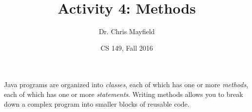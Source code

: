 \documentclass[12pt]{article}
\title{Activity 4: Methods}
\author{Dr. Chris Mayfield}
\date{CS 149, Fall 2016}
\begin{document}
\maketitle

Java programs are organized into {\em classes}, each of which has one or more {\em methods}, each of which has one or more {\em statements}.
Writing methods allows you to break down a complex program into smaller blocks of reusable code.



\newpage

\end{document}
